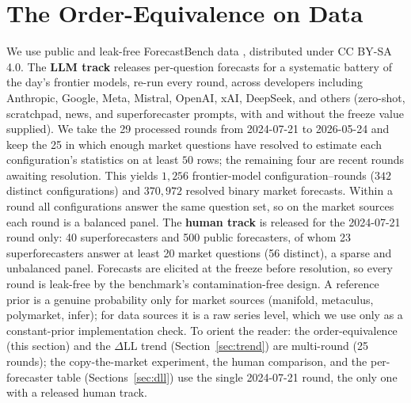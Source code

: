 \documentclass[11pt]{article}
\begin{document}
\section{The Order-Equivalence on Data}
\label{sec:order}
We use public and leak-free ForecastBench data \citep{karger2024}, distributed under CC BY-SA 4.0. The \textbf{LLM track} releases per-question forecasts for a systematic battery of the day's frontier models, re-run every round, across developers including Anthropic, Google, Meta, Mistral, OpenAI, xAI, DeepSeek, and others (zero-shot, scratchpad, news, and superforecaster prompts, with and without the freeze value supplied). We take the 29 processed rounds from 2024-07-21 to 2026-05-24 and keep the 25 in which enough market questions have resolved to estimate each configuration's statistics on at least $50$ rows; the remaining four are recent rounds awaiting resolution. This yields $1{,}256$ frontier-model configuration--rounds ($342$ distinct configurations) and $370{,}972$ resolved binary market forecasts. Within a round all configurations answer the same question set, so on the market sources each round is a balanced panel. The \textbf{human track} is released for the 2024-07-21 round only: 40 superforecasters and 500 public forecasters, of whom 23 superforecasters answer at least 20 market questions (56 distinct), a sparse and unbalanced panel. Forecasts are elicited at the freeze before resolution, so every round is leak-free by the benchmark's contamination-free design. A reference prior is a genuine probability only for market sources (manifold, metaculus, polymarket, infer); for data sources it is a raw series level, which we use only as a constant-prior implementation check. To orient the reader: the order-equivalence (this section) and the $\Delta$LL trend (Section~\ref{sec:trend}) are multi-round (25 rounds); the copy-the-market experiment, the human comparison, and the per-forecaster table (Sections~\ref{sec:dll}) use the single 2024-07-21 round, the only one with a released human track.
\end{document}
